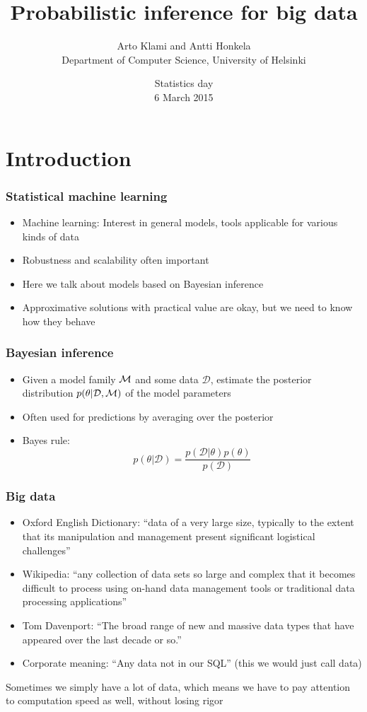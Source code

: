 \documentclass{beamer}
\title{Probabilistic inference for big data}
\author{Arto Klami and Antti Honkela\\
Department of Computer Science, University of Helsinki}
\date{Statistics day\\6 March 2015}
\newcommand{\dataset}{\mathcal{D}}
\newcommand{\parameters}{\theta}
\begin{document}
\frame{\titlepage}


\section{Introduction}

\begin{frame}
  \frametitle{Statistical machine learning}

  \begin{itemize}
  \item Machine learning: Interest in general models, tools applicable
    for various kinds of data
  \item Robustness and scalability often important
  \item Here we talk about models based on Bayesian inference
  \item Approximative solutions with practical value are okay, but
    we need to know how they behave
  \end{itemize}
\end{frame}

\begin{frame}
  \frametitle{Bayesian inference}

  \begin{itemize}
  \item Given a model family ${\cal M}$ and some data $\dataset$, estimate
    the posterior distribution $p(\parameters|\dataset,{\cal M})$ of the model
    parameters
  \item Often used for predictions by averaging over the posterior
  \item Bayes rule:
    \[
    p(\parameters|\dataset) = \frac{p(\dataset|\parameters)p(\parameters)}{p(\dataset)}
    \]
  \end{itemize}
\end{frame}

\begin{frame}
  \frametitle{Big data}

  \begin{itemize}
  \item Oxford English Dictionary: ``data of a very large size, typically to the extent that its manipulation and management present significant logistical challenges''
  \item Wikipedia: ``any collection of data sets so large and complex that it becomes difficult to process using on-hand data management tools or traditional data processing applications''
  \item Tom Davenport: ``The broad range of new and massive data types that have appeared over the last decade or so.''
  \item Corporate meaning: ``Any data not in our SQL'' (this we would just call data)
  \end{itemize}

  Sometimes we simply have a lot of data, which means we
    have to pay attention to computation speed as well, without losing
    rigor
\end{frame}
\end{document}
